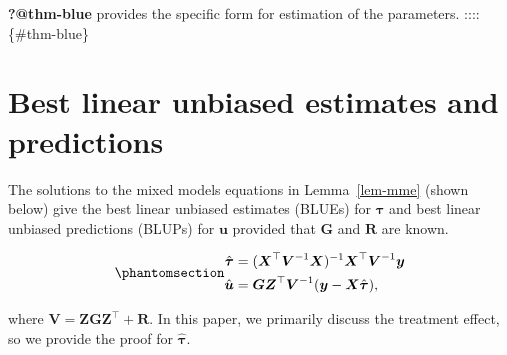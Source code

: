 \documentclass[
  a4paper,
  oneside,
  openany,
  12pt,
  onecolumn]{book}
\theoremstyle{definition}
\theoremstyle{definition}
\theoremstyle{plain}
\theoremstyle{remark}
\begin{document}
\textbf{?@thm-blue} provides the specific form for estimation of the
parameters. :::: \{\#thm-blue\}

\section{Best linear unbiased estimates and
predictions}\label{best-linear-unbiased-estimates-and-predictions}

The solutions to the mixed models equations in Lemma~\ref{lem-mme}
(shown below) give the best linear unbiased estimates (BLUEs) for
\(\boldsymbol{\tau}\) and best linear unbiased predictions (BLUPs) for
\(\boldsymbol{u}\) provided that \(\boldsymbol{G}\) and
\(\boldsymbol{R}\) are known.

\begin{equation}\phantomsection\label{eq-esti}{\begin{aligned}
\hat{\boldsymbol{\tau}} &= (\boldsymbol{X}^\top\boldsymbol{V}^{-1}\boldsymbol{X})^{-1}\boldsymbol{X}^\top\boldsymbol{V}^{-1}\boldsymbol{y}\\
\hat{\boldsymbol{u}} &= \boldsymbol{G}\boldsymbol{Z}^\top\boldsymbol{V}^{-1}(\boldsymbol{y} - \boldsymbol{X}\hat{\boldsymbol{\tau}}),
\end{aligned}}\end{equation}

where
\(\boldsymbol{V} = \boldsymbol{Z}\boldsymbol{G}\boldsymbol{Z}^\top + \boldsymbol{R}\).
In this paper, we primarily discuss the treatment effect, so we provide
the proof for \(\hat{\boldsymbol{\tau}}\).
\end{document}
